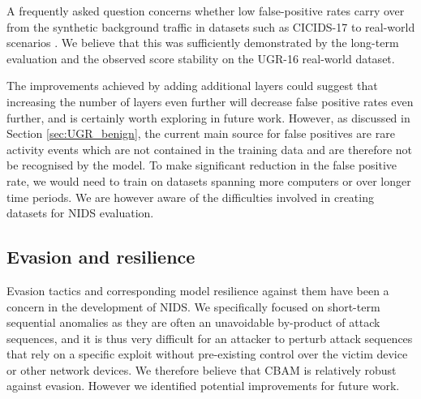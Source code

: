 A frequently asked question concerns whether low false-positive rates carry over from the synthetic background traffic in datasets such as CICIDS-17 to real-world scenarios \cite{sommer_outside_2010}. We believe that this was sufficiently demonstrated by the long-term evaluation and the observed score stability on the UGR-16 real-world dataset. 


The improvements achieved by adding additional layers could suggest that increasing the number of layers even further will decrease false positive rates even further, and is certainly worth exploring in future work. However, as discussed in Section \ref{sec:UGR_benign}, the current main source for false positives are rare activity events which are not contained in the training data and are therefore not be recognised by the model. To make significant reduction in the false positive rate, we would need to train on datasets spanning more computers or over longer time periods. We are however aware of the difficulties involved in creating datasets for NIDS evaluation.

\subsection{Evasion and resilience}
Evasion tactics and corresponding model resilience against them have been a concern in the development of NIDS. We specifically focused on short-term sequential anomalies as they are often an unavoidable by-product of attack sequences, and it is thus very difficult for an attacker to perturb attack sequences that rely on a specific exploit without pre-existing control over the victim device or other network devices. %
We therefore believe that CBAM is relatively robust against evasion. However we identified potential improvements for future work.


